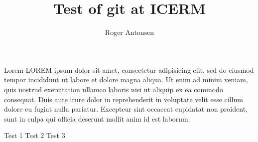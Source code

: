 \documentclass[12pt,a4paper]{article}
\author{Roger Antonsen}
\title{Test of git at ICERM}
\begin{document}
\maketitle

Lorem LOREM ipsum dolor sit amet, consectetur adipisicing elit, sed do eiusmod tempor incididunt ut labore et dolore magna aliqua. Ut enim ad minim veniam, quis nostrud exercitation ullamco laboris nisi ut aliquip ex ea commodo consequat. Duis aute irure dolor in reprehenderit in voluptate velit esse cillum dolore eu fugiat nulla pariatur. Excepteur sint occaecat cupidatat non proident, sunt in culpa qui officia deserunt mollit anim id est laborum.

Test 1
Test 2
Test 3
\end{document}
